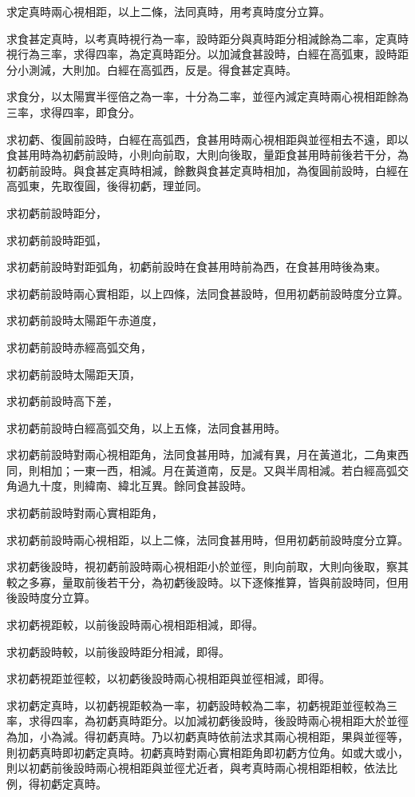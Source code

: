 \begin{pinyinscope}
求定真時兩心視相距，以上二條，法同真時，用考真時度分立算。

求食甚定真時，以考真時視行為一率，設時距分與真時距分相減餘為二率，定真時視行為三率，求得四率，為定真時距分。以加減食甚設時，白經在高弧東，設時距分小測減，大則加。白經在高弧西，反是。得食甚定真時。

求食分，以太陽實半徑倍之為一率，十分為二率，並徑內減定真時兩心視相距餘為三率，求得四率，即食分。

求初虧、復圓前設時，白經在高弧西，食甚用時兩心視相距與並徑相去不遠，即以食甚用時為初虧前設時，小則向前取，大則向後取，量距食甚用時前後若干分，為初虧前設時。與食甚定真時相減，餘數與食甚定真時相加，為復圓前設時，白經在高弧東，先取復圓，後得初虧，理並同。

求初虧前設時距分，

求初虧前設時距弧，

求初虧前設時對距弧角，初虧前設時在食甚用時前為西，在食甚用時後為東。

求初虧前設時兩心實相距，以上四條，法同食甚設時，但用初虧前設時度分立算。

求初虧前設時太陽距午赤道度，

求初虧前設時赤經高弧交角，

求初虧前設時太陽距天頂，

求初虧前設時高下差，

求初虧前設時白經高弧交角，以上五條，法同食甚用時。

求初虧前設時對兩心視相距角，法同食甚用時，加減有異，月在黃道北，二角東西同，則相加；一東一西，相減。月在黃道南，反是。又與半周相減。若白經高弧交角過九十度，則緯南、緯北互異。餘同食甚設時。

求初虧前設時對兩心實相距角，

求初虧前設時兩心視相距，以上二條，法同食甚用時，但用初虧前設時度分立算。

求初虧後設時，視初虧前設時兩心視相距小於並徑，則向前取，大則向後取，察其較之多寡，量取前後若干分，為初虧後設時。以下逐條推算，皆與前設時同，但用後設時度分立算。

求初虧視距較，以前後設時兩心視相距相減，即得。

求初虧設時較，以前後設時距分相減，即得。

求初虧視距並徑較，以初虧後設時兩心視相距與並徑相減，即得。

求初虧定真時，以初虧視距較為一率，初虧設時較為二率，初虧視距並徑較為三率，求得四率，為初虧真時距分。以加減初虧後設時，後設時兩心視相距大於並徑為加，小為減。得初虧真時。乃以初虧真時依前法求其兩心視相距，果與並徑等，則初虧真時即初虧定真時。初虧真時對兩心實相距角即初虧方位角。如或大或小，則以初虧前後設時兩心視相距與並徑尤近者，與考真時兩心視相距相較，依法比例，得初虧定真時。


\end{pinyinscope}
